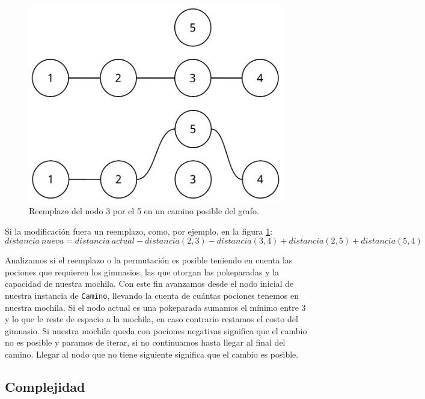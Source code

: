 \begin{figure}[H]
  \begin{center}
    \includegraphics[scale = 0.5]{imagenes/ej3_algoritmo_2.pdf}
    \caption{Reemplazo del nodo 3 por el 5 en un camino posible del grafo.}
    \label{fig:ej3_algoritmo_2}
  \end{center}
\end{figure}

Si la modificaci\'on fuera un reemplazo, como, por ejemplo, en la figura \ref{fig:ej3_algoritmo_2}:
\begin{equation*}
    distancia\ nueva = distancia\ actual - distancia(2,3) - distancia(3,4) + distancia(2,5) + distancia(5,4)
\end{equation*}

Analizamos si el reemplazo o la permutaci\'on es posible teniendo en cuenta las pociones que requieren los gimnasios, las que otorgan las pokeparadas y la capacidad de nuestra mochila. Con este fin avanzamos desde el nodo inicial de nuestra instancia de \texttt{Camino}, llevando la cuenta de cu\'antas pociones tenemos en nuestra mochila. Si el nodo actual es una pokeparada sumamos el m\'inimo entre 3 y lo que le reste de espacio a la mochila, en caso contrario restamos el costo del gimnasio. Si nuestra mochila queda con pociones negativas significa que el cambio no es posible y paramos de iterar, si no continuamos hasta llegar al final del camino. Llegar al nodo que no tiene siguiente significa que el cambio es posible.

\subsection{Complejidad}

